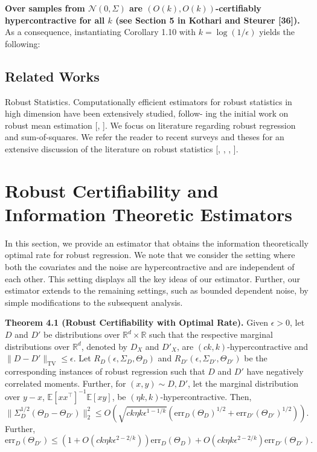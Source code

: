 \documentclass[preprint,11pt]{elsarticle}
\begin{document}
\noindent
\textbf{Over samples from $\mathcal{N}(0, \Sigma)$ are $(O(k), O(k))$-certifiably hypercontractive for all $k$ (see Section 5 in Kothari and Steurer [36]).} As a consequence, instantiating Corollary 1.10 with $k = \log(1/\epsilon)$ yields the following:

\subsection{\textbf{Related Works}}

Robust Statistics. Computationally efficient estimators for robust
statistics in high dimension have been extensively studied, follow-
ing the initial work on robust mean estimation [\cite{zhu2019generalized}, \cite{lecue2019robust} ]. We focus on
literature regarding robust regression and sum-of-squares. We refer
the reader to recent surveys and theses for an extensive discussion
of the literature on robust statistics [\cite{wainwright2019high}, \cite{altschuler2018best}, \cite{hopkins2018sub}, \cite{vershynin2010introduction}].



\section{Robust Certifiability and Information Theoretic Estimators}

In this section, we provide an estimator that obtains the information theoretically optimal rate for robust regression. We note that we consider the setting where both the covariates and the noise are hypercontractive and are independent of each other. This setting displays all the key ideas of our estimator. Further, our estimator extends to the remaining settings, such as bounded dependent noise, by simple modifications to the subsequent analysis.

\textbf{Theorem 4.1 (Robust Certifiability with Optimal Rate).} Given \(\epsilon > 0\), let \(D\) and \(D'\) be distributions over \(\mathbb{R}^d \times \mathbb{R}\) such that the respective marginal distributions over \(\mathbb{R}^d\), denoted by \(D_X\) and \(D'_X\), are \((c k, k)\)-hypercontractive and \(\|D - D'\|_{\text{TV}} \leq \epsilon\). Let \(R_D (\epsilon, \Sigma_D, \Theta_D)\) and \(R_{D'} (\epsilon, \Sigma_{D'}, \Theta_{D'})\) be the corresponding instances of robust regression such that \(D\) and \(D'\) have negatively correlated moments. Further, for \((x, y) \sim D, D'\), let the marginal distribution over \(y - x\), \(\mathbb{E}[x x^\top]^{-1} \mathbb{E}[x y]\), be \((\eta k, k)\)-hypercontractive. Then,
\[
\|\Sigma_D^{1/2} (\Theta_D - \Theta_{D'})\|_2^2 \leq O \left( \sqrt{c k \eta k \epsilon^{1 - 1/k}} \left( \text{err}_D (\Theta_D)^{1/2} + \text{err}_{D'} (\Theta_{D'})^{1/2} \right) \right).
\]
Further,
\[
\text{err}_D (\Theta_{D'}) \leq \left( 1 + O \left( c k \eta k \epsilon^{2 - 2/k} \right) \right) \text{err}_D (\Theta_D) + O \left( c k \eta k \epsilon^{2 - 2/k} \right) \text{err}_{D'} (\Theta_{D'}).
\]
\end{document}
